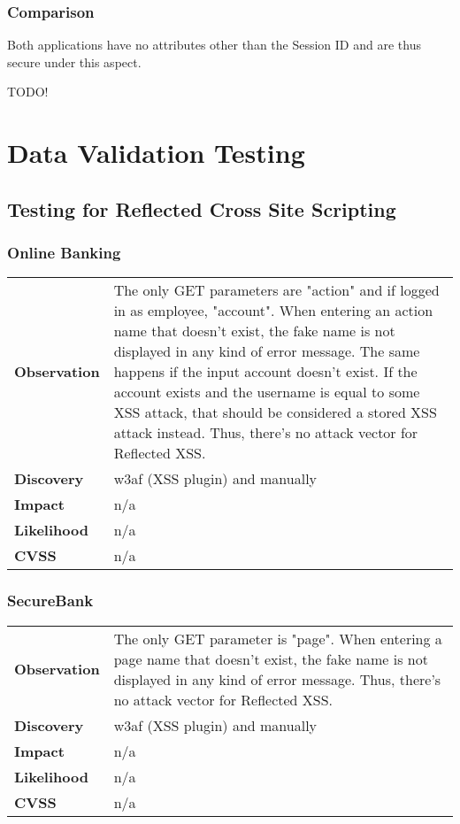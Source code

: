 \subsubsection*{Comparison}
Both applications have no attributes other than the Session ID and are thus secure under this aspect.


TODO!









\section{Data Validation Testing}

\subsection{Testing for Reflected Cross Site Scripting}

\subsubsection*{Online Banking}

\begin{tabular}{l|p{10cm}}
\textbf{Observation} & The only GET parameters are "action" and if logged in as employee, "account". When entering an action name that doesn't exist, the fake name is not displayed in any kind of error message. The same happens if the input account doesn't exist. If the account exists and the username is equal to some XSS attack, that should be considered a stored XSS attack instead. Thus, there's no attack vector for Reflected XSS. \\
\textbf{Discovery} & w3af (XSS plugin) and manually  \\
\textbf{Impact} & n/a \\
\textbf{Likelihood} & n/a \\
\textbf{CVSS} & n/a \\
\end{tabular}

\subsubsection*{SecureBank}

\begin{tabular}{l|p{10cm}}
\textbf{Observation} & The only GET parameter is "page". When entering a page name that doesn't exist, the fake name is not displayed in any kind of error message. Thus, there's no attack vector for Reflected XSS. \\
\textbf{Discovery} & w3af (XSS plugin) and manually \\
\textbf{Impact} & n/a \\
\textbf{Likelihood} & n/a \\
\textbf{CVSS} & n/a \\
\end{tabular}


